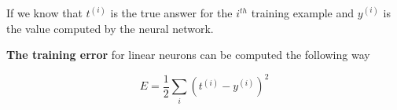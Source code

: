 \documentclass[12pt]{article}
\begin{document}
\begin{landscape}
\centerline{If we know that $t^{(i)}$ is the true answer for the $i^{th}$ training example and $y^{(i)}$ is the value computed by the neural network.}
\centerline{\textbf{The training error} for linear neurons can be computed the following way}
$$E =\frac{1}{2}\sum_{i}(t^{(i)} - y^{(i)})^2$$


\end{landscape}
\end{document}
